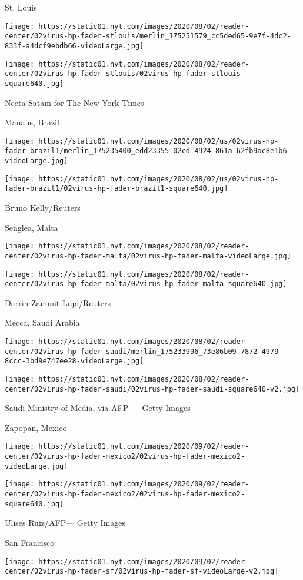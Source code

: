 St. Louis

\texttt{[image: https://static01.nyt.com/images/2020/08/02/reader-center/02virus-hp-fader-stlouis/merlin\_175251579\_cc5ded65-9e7f-4dc2-833f-a4dcf9ebdb66-videoLarge.jpg]}

\texttt{[image: https://static01.nyt.com/images/2020/08/02/reader-center/02virus-hp-fader-stlouis/02virus-hp-fader-stlouis-square640.jpg]}

 Neeta Satam for The New York Times

Manaus, Brazil

\texttt{[image: https://static01.nyt.com/images/2020/08/02/us/02virus-hp-fader-brazil1/merlin\_175235400\_edd23355-02cd-4924-861a-62fb9ac8e1b6-videoLarge.jpg]}

\texttt{[image: https://static01.nyt.com/images/2020/08/02/us/02virus-hp-fader-brazil1/02virus-hp-fader-brazil1-square640.jpg]}

 Bruno Kelly/Reuters

Senglea, Malta

\texttt{[image: https://static01.nyt.com/images/2020/08/02/reader-center/02virus-hp-fader-malta/02virus-hp-fader-malta-videoLarge.jpg]}

\texttt{[image: https://static01.nyt.com/images/2020/08/02/reader-center/02virus-hp-fader-malta/02virus-hp-fader-malta-square640.jpg]}

 Darrin Zammit Lupi/Reuters

Mecca, Saudi Arabia

\texttt{[image: https://static01.nyt.com/images/2020/08/02/reader-center/02virus-hp-fader-saudi/merlin\_175233996\_73e86b09-7872-4979-8ccc-3bd9e747ee28-videoLarge.jpg]}

\texttt{[image: https://static01.nyt.com/images/2020/08/02/reader-center/02virus-hp-fader-saudi/02virus-hp-fader-saudi-square640-v2.jpg]}

 Saudi Ministry of Media, via AFP --- Getty Images

Zapopan, Mexico

\texttt{[image: https://static01.nyt.com/images/2020/09/02/reader-center/02virus-hp-fader-mexico2/02virus-hp-fader-mexico2-videoLarge.jpg]}

\texttt{[image: https://static01.nyt.com/images/2020/09/02/reader-center/02virus-hp-fader-mexico2/02virus-hp-fader-mexico2-square640.jpg]}

 Ulises Ruiz/AFP--- Getty Images

San Francisco

\texttt{[image: https://static01.nyt.com/images/2020/09/02/reader-center/02virus-hp-fader-sf/02virus-hp-fader-sf-videoLarge-v2.jpg]}

